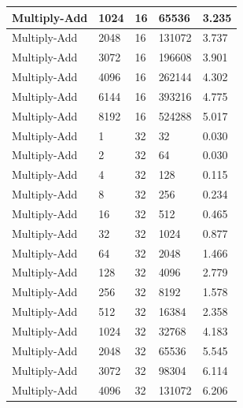 \documentclass{article}
\begin{document}
\begin{longtable}{|l|l|l|l|l|}
Multiply-Add       & 1024 & 16          & 65536             & 3.235             \\ \hline
Multiply-Add       & 2048 & 16          & 131072            & 3.737             \\ \hline
Multiply-Add       & 3072 & 16          & 196608            & 3.901             \\ \hline
Multiply-Add       & 4096 & 16          & 262144            & 4.302             \\ \hline
Multiply-Add       & 6144 & 16          & 393216            & 4.775             \\ \hline
Multiply-Add       & 8192 & 16          & 524288            & 5.017             \\ \hline
Multiply-Add       & 1    & 32          & 32                & 0.030             \\ \hline
Multiply-Add       & 2    & 32          & 64                & 0.030             \\ \hline
Multiply-Add       & 4    & 32          & 128               & 0.115             \\ \hline
Multiply-Add       & 8    & 32          & 256               & 0.234             \\ \hline
Multiply-Add       & 16   & 32          & 512               & 0.465             \\ \hline
Multiply-Add       & 32   & 32          & 1024              & 0.877             \\ \hline
Multiply-Add       & 64   & 32          & 2048              & 1.466             \\ \hline
Multiply-Add       & 128  & 32          & 4096              & 2.779             \\ \hline
Multiply-Add       & 256  & 32          & 8192              & 1.578             \\ \hline
Multiply-Add       & 512  & 32          & 16384             & 2.358             \\ \hline
Multiply-Add       & 1024 & 32          & 32768             & 4.183             \\ \hline
Multiply-Add       & 2048 & 32          & 65536             & 5.545             \\ \hline
Multiply-Add       & 3072 & 32          & 98304             & 6.114             \\ \hline
Multiply-Add       & 4096 & 32          & 131072            & 6.206             \\ \hline

\end{longtable}
\end{document}
